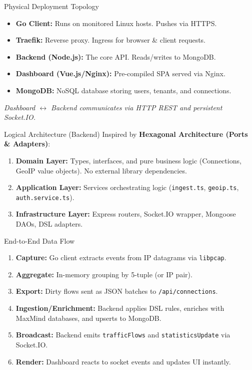 \documentclass[aspectratio=169]{beamer}
\begin{document}
\begin{frame}{Physical Deployment Topology}
    \begin{itemize}
        \item \textbf{Go Client:} Runs on monitored Linux hosts. Pushes via HTTPS.
        \item \textbf{Traefik:} Reverse proxy. Ingress for browser \& client requests.
        \item \textbf{Backend (Node.js):} The core API. Reads/writes to MongoDB.
        \item \textbf{Dashboard (Vue.js/Nginx):} Pre-compiled SPA served via Nginx.
        \item \textbf{MongoDB:} NoSQL database storing users, tenants, and connections.
    \end{itemize}
    \vspace{0.3cm}
    {\small \textit{Dashboard $\leftrightarrow$ Backend communicates via HTTP REST and persistent Socket.IO.}}
\end{frame}

\begin{frame}{Logical Architecture (Backend)}
    Inspired by \textbf{Hexagonal Architecture (Ports \& Adapters)}:
    \vspace{0.3cm}
    \begin{enumerate}
        \item \textbf{Domain Layer:} Types, interfaces, and pure business logic (Connections, GeoIP value objects). No external library dependencies.
        \item \textbf{Application Layer:} Services orchestrating logic (\texttt{ingest.ts}, \texttt{geoip.ts}, \texttt{auth.service.ts}).
        \item \textbf{Infrastructure Layer:} Express routers, Socket.IO wrapper, Mongoose DAOs, DSL adapters.
    \end{enumerate}
\end{frame}

\begin{frame}{End-to-End Data Flow}
    \begin{enumerate}
        \item \textbf{Capture:} Go client extracts events from IP datagrams via \texttt{libpcap}.
        \item \textbf{Aggregate:} In-memory grouping by 5-tuple (or IP pair).
        \item \textbf{Export:} Dirty flows sent as JSON batches to \texttt{/api/connections}.
        \item \textbf{Ingestion/Enrichment:} Backend applies DSL rules, enriches with MaxMind databases, and upserts to MongoDB.
        \item \textbf{Broadcast:} Backend emits \texttt{trafficFlows} and \texttt{statisticsUpdate} via Socket.IO.
        \item \textbf{Render:} Dashboard reacts to socket events and updates UI instantly.
    \end{enumerate}
\end{frame}
\end{document}
